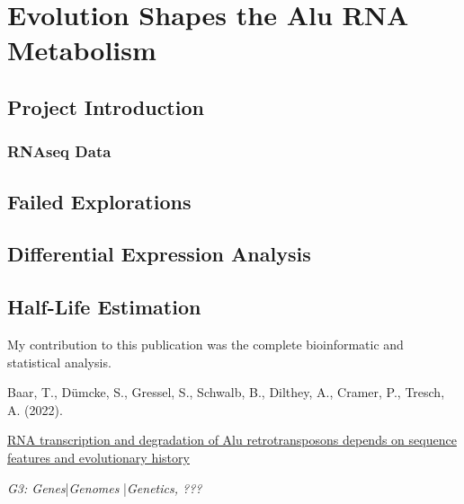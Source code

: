 
\chapter{Evolution Shapes the Alu RNA Metabolism}

\section{Project Introduction}

\subsection{RNAseq Data}

\section{Failed Explorations}

\section{Differential Expression Analysis}

\section{Half-Life Estimation}

\vfill
\noindent My contribution to this publication was the complete bioinformatic
and statistical analysis.\nopagebreak
\medskip
\begin{tcolorbox}[
  boxrule=0pt, leftrule=1pt, colframe=s-blue, colback=white, sharp corners=all]%
  \raggedright
  Baar, T., Dümcke, S., Gressel, S., Schwalb, B.,
  Dilthey, A., Cramer, P., Tresch, A. (2022).
  
  \smallskip
  \href{https://doi.org/10.1093/g3journal/jkac054}
    {RNA transcription and degradation of Alu retrotransposons depends on
    sequence features and evolutionary history}

  \smallskip
  \textit{G3: Genes}\thinspace{}|\thinspace{}\textit{Genomes}%
    \thinspace{}|\thinspace{}\textit{Genetics, ???}
\end{tcolorbox}